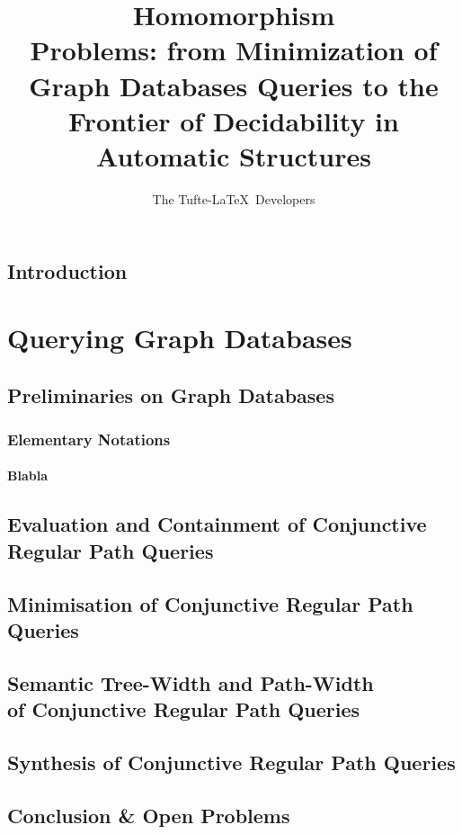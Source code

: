 \documentclass[a4paper,sfsidenotes,twoside,justified]{tufte-book-custom}
\title[On Homomorphism Problems]{ Homomorphism\\ Problems: from Minimization of Graph Databases Queries to the Frontier of Decidability in Automatic Structures}
\author[The Tufte-LaTeX Developers]{The Tufte-LaTeX\ Developers}
\begin{document}
\frontmatter





\mainmatter
\chapter{Introduction}

\part{Querying Graph Databases}

\chapter{Preliminaries on Graph Databases}

\section{Elementary Notations}

\subsection{Blabla}

\lipsum[1-40]

\chapter{Evaluation and Containment of Conjunctive Regular Path Queries}

\chapter{Minimisation of Conjunctive Regular Path Queries}

\chapter[{Semantic Tree-Width and Path-Width of Conjunctive Regular Path Queries}]{Semantic Tree-Width and Path-Width\\of Conjunctive Regular Path Queries}

\chapter{Synthesis of Conjunctive Regular Path Queries}

\chapter{Conclusion \& Open Problems}
\end{document}
